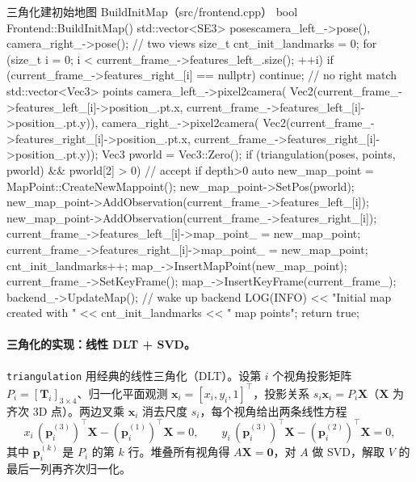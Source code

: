 \begin{codebox}[C++]{三角化建初始地图 BuildInitMap（src/frontend.cpp）}
bool Frontend::BuildInitMap() {
    std::vector<SE3> poses{camera_left_->pose(), camera_right_->pose()};  // two views
    size_t cnt_init_landmarks = 0;
    for (size_t i = 0; i < current_frame_->features_left_.size(); ++i) {
        if (current_frame_->features_right_[i] == nullptr) continue;      // no right match
        std::vector<Vec3> points{
            camera_left_->pixel2camera(
                Vec2(current_frame_->features_left_[i]->position_.pt.x,
                     current_frame_->features_left_[i]->position_.pt.y)),
            camera_right_->pixel2camera(
                Vec2(current_frame_->features_right_[i]->position_.pt.x,
                     current_frame_->features_right_[i]->position_.pt.y))};
        Vec3 pworld = Vec3::Zero();
        if (triangulation(poses, points, pworld) && pworld[2] > 0) {      // accept if depth>0
            auto new_map_point = MapPoint::CreateNewMappoint();
            new_map_point->SetPos(pworld);
            new_map_point->AddObservation(current_frame_->features_left_[i]);
            new_map_point->AddObservation(current_frame_->features_right_[i]);
            current_frame_->features_left_[i]->map_point_  = new_map_point;
            current_frame_->features_right_[i]->map_point_ = new_map_point;
            cnt_init_landmarks++;
            map_->InsertMapPoint(new_map_point);
        }
    }
    current_frame_->SetKeyFrame();
    map_->InsertKeyFrame(current_frame_);
    backend_->UpdateMap();                          // wake up backend
    LOG(INFO) << "Initial map created with " << cnt_init_landmarks << " map points";
    return true;
}
\end{codebox}

\paragraph{三角化的实现：线性 DLT + SVD。}
\texttt{triangulation} 用经典的线性三角化（DLT）。设第 $i$ 个视角投影矩阵 $P_i=[\mathbf{T}_i]_{3\times4}$、归一化平面观测 $\mathbf{x}_i=[x_i,y_i,1]^\top$，投影关系 $s_i\mathbf{x}_i=P_i\mathbf{X}$（$\mathbf{X}$ 为齐次 3D 点）。两边叉乘 $\mathbf{x}_i$ 消去尺度 $s_i$，每个视角给出两条线性方程
\begin{equation}
  x_i\,(\mathbf{p}_i^{(3)})^\top\mathbf{X}-(\mathbf{p}_i^{(1)})^\top\mathbf{X}=0,\qquad
  y_i\,(\mathbf{p}_i^{(3)})^\top\mathbf{X}-(\mathbf{p}_i^{(2)})^\top\mathbf{X}=0,
  \label{eq:sys-triang}
\end{equation}
其中 $\mathbf{p}_i^{(k)}$ 是 $P_i$ 的第 $k$ 行。堆叠所有视角得 $A\mathbf{X}=\mathbf{0}$，对 $A$ 做 SVD，解取 $V$ 的最后一列再齐次归一化。

